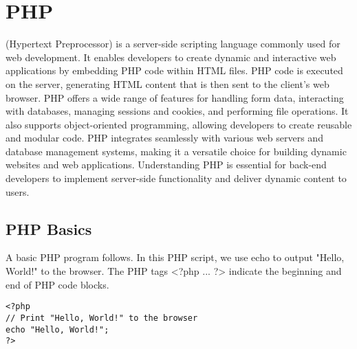 \chapter{PHP}
\thispagestyle{fancy}
\lstset{}\lstset{language=php, style=phpstyle}

 (Hypertext Preprocessor) is a server-side scripting language commonly used for web development. It enables developers to create dynamic and interactive web applications by embedding PHP code within HTML files. PHP code is executed on the server, generating HTML content that is then sent to the client's web browser. PHP offers a wide range of features for handling form data, interacting with databases, managing sessions and cookies, and performing file operations. It also supports object-oriented programming, allowing developers to create reusable and modular code. PHP integrates seamlessly with various web servers and database management systems, making it a versatile choice for building dynamic websites and web applications. Understanding PHP is essential for back-end developers to implement server-side functionality and deliver dynamic content to users.













\section{PHP Basics}

A basic PHP  program follows. In this PHP script, we use echo to output "Hello, World!" to the browser. The PHP tags <?php ... ?> indicate the beginning and end of PHP code blocks.

\begin{lstlisting}
<?php
// Print "Hello, World!" to the browser
echo "Hello, World!";
?>
\end{lstlisting}